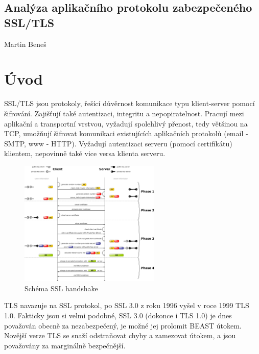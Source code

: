 \documentclass[10pt,a4paper,titlepage]{article}
\begin{document}

  \begin{center}
    \section*{Analýza aplikačního protokolu zabezpečeného SSL/TLS}
    Martin Beneš
  \end{center}

  \section*{Úvod}
  SSL/TLS jsou protokoly, řešící důvěrnost komunikace typu klient-server pomocí šifrování.
  Zajišťují také autentizaci, integritu a nepopiratelnost. Pracují mezi aplikační a
  transportní vrstvou, vyžadují spolehlivý přenost, tedy většinou na TCP, umožňují šifrovat
  komunikaci existujících aplikačních protokolů (email - SMTP, www - HTTP).
  Vyžadují autentizaci serveru (pomocí certifikátu) klientem, nepovinně také vice versa
  klienta serveru. \cite{DigiCert} \cite{RootSsl}

  \begin{figure}[h!]
    \begin{center}
      \includegraphics[width=0.6\textwidth]{ssl.png}
      \caption{Schéma SSL handshake\label{fig:sslhandshake} \cite{WikiSSL}}
    \end{center}    
  \end{figure}

  TLS navazuje na SSL protokol, po SSL 3.0 z roku 1996 vyšel v roce 1999 TLS 1.0.
  Fakticky jsou si velmi podobné, SSL 3.0 (dokonce i TLS 1.0) je dnes považován obecně
  za nezabezpečený, je možné jej prolomit BEAST útokem. Novější verze TLS se snaží
  odstraňovat chyby a zamezovat útokem, a jsou považovány za marginálně bezpečnější.
  \cite{LuxSci}
\end{document}
